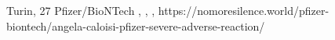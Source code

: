           {Turin, }
          {27}
          {Pfizer/BioNTech}
          {}
          {
            ,
            ,
            ,
          }
          {https://nomoresilence.world/pfizer-biontech/angela-caloisi-pfizer-severe-adverse-reaction/}


